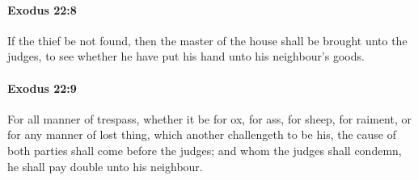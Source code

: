 		\paragraph{Exodus 22:8} %
			\label{EXODUS-22-8}

			If the thief be not found, then the master of the house shall be brought unto the judges, to see whether he have put his hand unto his neighbour's goods.


		\paragraph{Exodus 22:9} %
			\label{EXODUS-22-9}

			For all manner of trespass, whether it be for ox, for ass, for sheep, for raiment, or for any manner of lost thing, which another challengeth to be his, the cause of both parties shall come before the judges; and whom the judges shall condemn, he shall pay double unto his neighbour.

